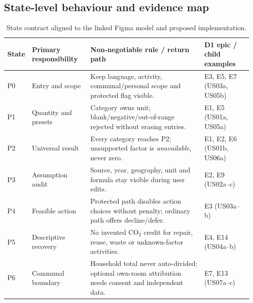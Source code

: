 \documentclass[12pt,a4paper]{article}
\begin{document}
\subsection{State-level behaviour and evidence map}
\begin{table}[ht]
\centering\small
\caption{State contract aligned to the linked Figma model and proposed implementation.}
\label{tab:state-contract}
\footnotesize\setlength{\tabcolsep}{3.5pt}
\begin{tabularx}{\textwidth}{@{}p{1.15cm}p{2.15cm}Xp{2.45cm}@{}}
\toprule
\textbf{State}&\textbf{Primary responsibility}&\textbf{Non-negotiable rule / return path}&\textbf{D1 epic / child examples}\\
\midrule
P0&Entry and scope&Keep language, activity, communal/personal scope and protected flag visible.&E3, E5, E7 (US03a, US05b)\\
P1&Quantity and presets&Category owns unit; blank/negative/out-of-range rejected without erasing entries.&E1, E5 (US01a, US05a)\\
P2&Universal result&Every category reaches P2; unsupported factor is \emph{unavailable}, never zero.&E1, E2, E6 (US01b, US06a)\\
P3&Assumption audit&Source, year, geography, unit and formula stay visible during user edits.&E2, E9 (US02a--c)\\
P4&Feasible action&Protected path disables action choices without penalty; ordinary path offers decline/defer.&E3 (US03a--b)\\
P5&Descriptive recovery&No invented CO$_2$ credit for repair, reuse, waste or unknown-factor activities.&E4, E14 (US04a--b)\\
P6&Communal boundary&Household total never auto-divided; optional own-room attribution needs consent and independent data.&E7, E13 (US07a--c)\\
\bottomrule
\end{tabularx}
\end{table}
\end{document}
